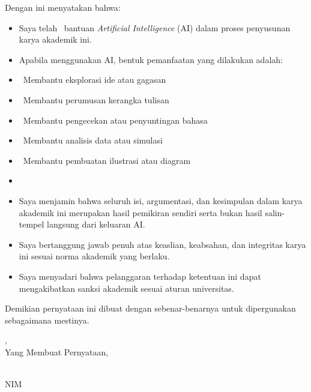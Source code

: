 

\noindent Dengan ini menyatakan bahwa:

\begin{itemize}[leftmargin=0.63cm,label=--,nosep]
  \item Saya telah \StatusPenggunaanAI\ bantuan \textit{Artificial
    Intelligence} (AI) dalam proses penyusunan karya akademik ini.
  \item Apabila menggunakan AI, bentuk pemanfaatan yang dilakukan adalah:
\end{itemize}

\begin{itemize}[leftmargin=1.25cm,label={},nosep]
  \item \AIExplorasiIde\ Membantu eksplorasi ide atau gagasan
  \item \AIKerangkaTulisan\ Membantu perumusan kerangka tulisan
  \item \AIPenyuntinganBahasa\ Membantu pengecekan atau penyuntingan bahasa
  \item \AIAnalisisData\ Membantu analisis data atau simulasi
  \item \AIIlustrasi\ Membantu pembuatan ilustrasi atau diagram
  \item \AILainnya
\end{itemize}

\begin{itemize}[leftmargin=0.63cm,label=--,nosep]
  \item Saya menjamin bahwa seluruh isi, argumentasi, dan kesimpulan dalam
    karya akademik ini merupakan hasil pemikiran sendiri serta bukan hasil
    salin-tempel langsung dari keluaran AI.
  \item Saya bertanggung jawab penuh atas keaslian, keabsahan, dan integritas
    karya ini sesuai norma akademik yang berlaku.
  \item Saya menyadari bahwa pelanggaran terhadap ketentuan ini dapat
    mengakibatkan sanksi akademik sesuai aturan universitas.
\end{itemize}

\noindent Demikian pernyataan ini dibuat dengan sebenar-benarnya untuk
dipergunakan sebagaimana mestinya.

\vspace{6.9pt}
\noindent\hfill
\begin{minipage}{0.52\textwidth}
  \raggedright
  \NamaKota, \TanggalPernyataan\\
  Yang Membuat Pernyataan,

  \vspace{1.4cm}

  \underline{\NamaMahasiswa}\\
  NIM \NIM
\end{minipage}
